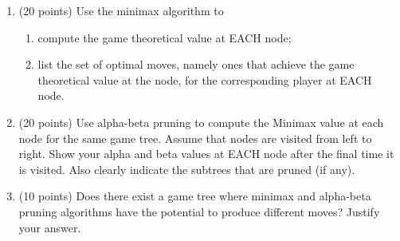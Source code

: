 \documentclass{article}
\begin{document}
\begin{enumerate}

\item (20 points) 
    Use the minimax algorithm to 
    \begin{enumerate}
	\item compute the game theoretical value at EACH node; 
	\item list the set of optimal moves, namely ones that achieve the game theoretical value at the node, for the corresponding player at EACH node.
    \end{enumerate}

\item (20 points)
	Use alpha-beta pruning to compute the Minimax value at each node for the
	same game tree. Assume that nodes 
	are visited from left to right. Show your alpha and beta values at EACH node 
	after the final time it is visited. Also clearly indicate the subtrees that are pruned (if any).

\item (10 points)
	Does there exist a game tree where minimax and alpha-beta pruning algorithms have the potential to produce 
	different moves? Justify your answer.


\end{enumerate}
\end{document}
